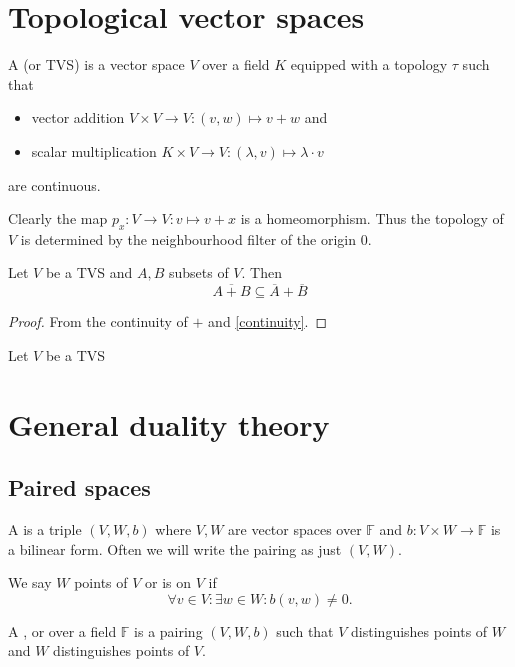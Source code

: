 \section{Topological vector spaces}
\begin{definition}
A  (or TVS) is a vector space $V$ over a field $K$ equipped with a topology $\tau$ such that
\begin{itemize}
\item vector addition $V\times V \to V: (v, w) \mapsto v+w$ and
\item scalar multiplication $K\times V\to V: (\lambda, v) \mapsto \lambda \cdot v$
\end{itemize}
are continuous.
\end{definition}

Clearly the map $p_x: V\to V: v\mapsto v+x$ is a homeomorphism. Thus the topology of $V$ is determined by the neighbourhood filter of the origin $0$.

\begin{lemma} \label{closureSum}
Let $V$ be a TVS and $A,B$ subsets of $V$. Then
\[ \overline{A+B} \subseteq \overline{A} + \overline{B} \]
\end{lemma}
\begin{proof}
From the continuity of $+$ and \ref{continuity}.
\end{proof}

\begin{lemma}
Let $V$ be a TVS
\end{lemma}

\section{General duality theory}
\subsection{Paired spaces}
\begin{definition}
A  is a triple $(V,W, b)$ where $V,W$ are vector spaces over $\mathbb{F}$ and $b: V\times W\to \mathbb{F}$ is a bilinear form. Often we will write the pairing as just $(V,W)$.

We say $W$  points of $V$ or is  on $V$ if
\[ \forall v\in V: \exists w\in W: b(v,w) \neq 0. \]

A ,  or  over a field $\mathbb{F}$ is a pairing $(V,W,b)$ such that $V$ distinguishes points of $W$ and $W$ distinguishes points of $V$.
\end{definition}

